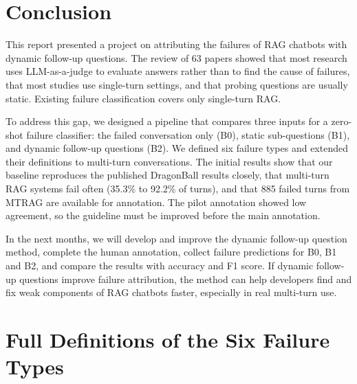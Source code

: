 \documentclass[11pt]{article}
\begin{document}
\section{Conclusion}
\label{sec:conclusion}
This report presented a project on attributing the failures of RAG chatbots with dynamic follow-up questions. The review of 63 papers showed that most research uses LLM-as-a-judge to evaluate answers rather than to find the cause of failures, that most studies use single-turn settings, and that probing questions are usually static. Existing failure classification covers only single-turn RAG.

To address this gap, we designed a pipeline that compares three inputs for a zero-shot failure classifier: the failed conversation only (B0), static sub-questions (B1), and dynamic follow-up questions (B2). We defined six failure types and extended their definitions to multi-turn conversations. The initial results show that our baseline reproduces the published DragonBall results closely, that multi-turn RAG systems fail often (35.3\% to 92.2\% of turns), and that 885 failed turns from MTRAG are available for annotation. The pilot annotation showed low agreement, so the guideline must be improved before the main annotation.

In the next months, we will develop and improve the dynamic follow-up question method, complete the human annotation, collect failure predictions for B0, B1 and B2, and compare the results with accuracy and F1 score. If dynamic follow-up questions improve failure attribution, the method can help developers find and fix weak components of RAG chatbots faster, especially in real multi-turn use.



\onecolumn %
\appendix
{}

\section{Full Definitions of the Six Failure Types}
\label{app:failures}
\end{document}
